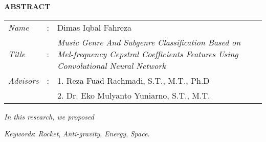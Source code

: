\begin{center}
  \large\textbf{ABSTRACT}
\end{center}


\vspace{2ex}

\begingroup
  \setlength{\tabcolsep}{0pt}

  \noindent
  \begin{tabularx}{\textwidth}{l >{\centering}m{3em} X}
    \emph{Name}     &:& Dimas Iqbal Fahreza \\

    \emph{Title}    &:& \emph{Music Genre And Subgenre Classification Based on Mel-frequency Cepstral Coefficients Features Using Convolutional Neural Network} \\

    \emph{Advisors} &:& 1. Reza Fuad Rachmadi, S.T., M.T., Ph.D \\
                    & & 2. Dr. Eko Mulyanto Yuniarno, S.T., M.T. \\
  \end{tabularx}
\endgroup

\emph{In this research, we proposed \lipsum[1]}

\emph{Keywords}: \emph{Rocket}, \emph{Anti-gravity}, \emph{Energy}, \emph{Space}.
